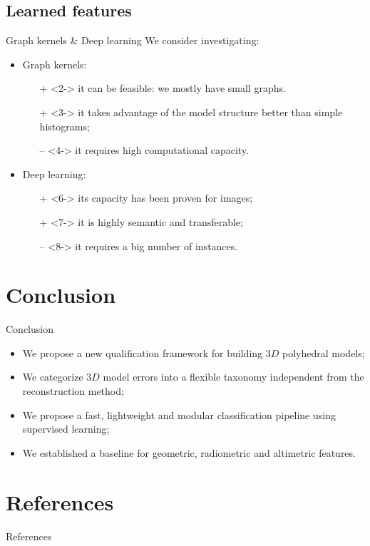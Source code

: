 \documentclass{beamer}
\begin{document}
        \subsection{Learned features}
            \begin{frame}{Graph kernels \& Deep learning}
                We consider investigating:
                \begin{itemize}[label=$\blacktriangleright$, font=\color{IGNGreen}]
                    \item<1-> Graph kernels:
                    \begin{itemize}
                        \item[\color{green} +]<2-> it can be feasible: we mostly have small graphs.
                        \item[\color{green} +]<3-> it takes advantage of the model structure better than simple histograms;
                        \item[\color{red} --]<4-> it requires high computational capacity.
                    \end{itemize}
                    \item<5-> Deep learning:
                    \begin{itemize}
                        \item[\color{green} +]<6-> its capacity has been proven for images;
                        \item[\color{green} +]<7-> it is highly semantic and transferable;
                        \item[\color{red} --]<8-> it requires a big number of instances.
                    \end{itemize}
                \end{itemize}
            \end{frame}
    \section{Conclusion}
        \begin{frame}{Conclusion}
            \begin{itemize}[label=$\blacktriangleright$, font=\color{IGNGreen}]
                \item<1-> We propose a new qualification framework for building $3D$ polyhedral models;
                \item<2-> We categorize $3D$ model errors into a flexible taxonomy independent from the reconstruction method;
                \item<3-> We propose a fast, lightweight and modular classification pipeline using supervised learning;
                \item<4-> We established a baseline for geometric, radiometric and altimetric features.
            \end{itemize}
        \end{frame}
    \section*{References}
        \begin{frame}[allowframebreaks]{References}
            \printbibliography
        \end{frame}
    \appendix
\end{document}
